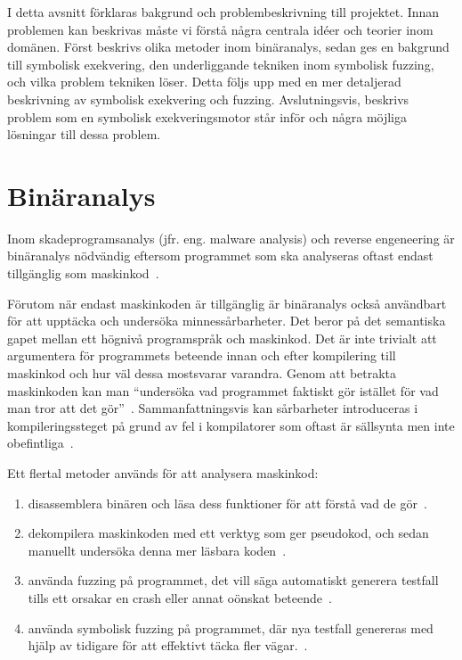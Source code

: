 I detta avsnitt förklaras bakgrund och problembeskrivning till projektet. Innan
problemen kan beskrivas måste vi förstå några centrala idéer och teorier inom
domänen. Först beskrivs olika metoder inom binäranalys, sedan ges en bakgrund
till symbolisk exekvering, den underliggande tekniken inom symbolisk fuzzing, och vilka
problem tekniken löser. Detta följs upp med en mer detaljerad beskrivning av symbolisk
exekvering och fuzzing. Avslutningsvis, beskrivs problem som en symbolisk exekveringsmotor
står inför och några möjliga lösningar till dessa problem.

\section{Binäranalys}
\label{sec:binar_analys}
Inom skadeprogramsanalys (jfr. eng. malware analysis) och reverse engeneering
är binäranalys nödvändig eftersom programmet som ska analyseras oftast endast
tillgänglig som maskinkod~\cite{andriesse2018}.

Förutom när endast maskinkoden är tillgänglig är binäranalys också användbart
för att upptäcka och undersöka minnessårbarheter. Det beror på det semantiska
gapet mellan ett högnivå programspråk och maskinkod. Det är inte trivialt att
argumentera för programmets beteende innan och efter kompilering till maskinkod
och hur väl dessa mostsvarar varandra. Genom att betrakta maskinkoden kan man
``undersöka vad programmet faktiskt gör istället för vad man tror att det
gör''~\cite{andriesse2018}. Sammanfattningsvis kan sårbarheter introduceras i
kompileringssteget på grund av fel i kompilatorer som oftast är sällsynta men
inte obefintliga~\cite{silentbugsmatter}.

Ett flertal metoder används för att analysera maskinkod:
\begin{enumerate}
    \item disassemblera binären och läsa dess funktioner för att förstå vad de gör~\cite{ghidra_website}.
    \item dekompilera maskinkoden med ett verktyg som ger pseudokod, och sedan manuellt undersöka denna mer läsbara koden~\cite{ghidra_website}.
    \item använda fuzzing på programmet, det vill säga automatiskt generera testfall tills ett orsakar en crash eller
          annat oönskat beteende~\cite{8371326}.
    \item använda symbolisk fuzzing på programmet, där nya testfall genereras med hjälp av tidigare för att effektivt täcka fler vägar.~\cite{sage}.
\end{enumerate}

